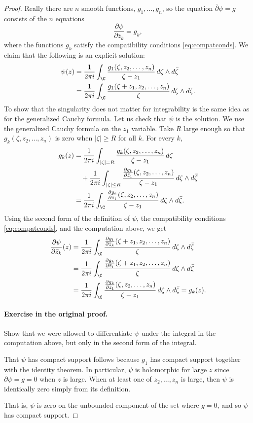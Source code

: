 \begin{proof}
Really there are $n$ smooth functions, $g_1,\ldots,g_n$, so the equation $\bar\partial\psi=g$ consists of the $n$ equations
\[\frac{\partial\psi}{\partial\bar z_k}=g_k,\]
where the functions $g_k$ satisfy the compatibility conditions \eqref{eq:compatconds}. We claim that the following is an explicit solution:
\begin{align*}
\psi(z)&=\frac1{2\pi i}\int_\C\frac{g_1(\zeta,z_2,\ldots,z_n)}{\zeta-z_1}\,d\zeta\wedge d\bar\zeta\\
&=\frac1{2\pi i}\int_\C\frac{g_1(\zeta+z_1,z_2,\ldots,z_n)}{\zeta}\,d\zeta\wedge d\bar\zeta.
\end{align*}
To show that the singularity does not matter for integrability is the same idea as for the generalized Cauchy formula. Let us check that $\psi$ is the solution. We use the generalized Cauchy formula on the $z_1$ variable. Take $R$ large enough so that $g_k(\zeta,z_2,\ldots,z_n)$ is zero when $|\zeta|\geq R$ for all $k$. For every $k$,
\begin{align*}
g_k(z)&=\frac1{2\pi i}\int_{|\zeta|=R}\frac{g_k(\zeta,z_2,\ldots,z_n)}{\zeta-z_1}\,d\zeta\\
&\quad+\frac1{2\pi i}\int_{|\zeta|\leq R}\frac{\frac{\partial g_k}{\partial\bar z_1}(\zeta,z_2,\ldots,z_n)}{\zeta-z_1}\,d\zeta\wedge d\bar\zeta\\
&=\frac1{2\pi i}\int_\C\frac{\frac{\partial g_k}{\partial\bar z_1}(\zeta,z_2,\ldots,z_n)}{\zeta-z_1}\,d\zeta\wedge d\bar\zeta.
\end{align*}
Using the second form of the definition of $\psi$, the compatibility conditions \eqref{eq:compatconds}, and the computation above, we get
\begin{align*}
\frac{\partial\psi}{\partial\bar z_k}(z)
&=\frac1{2\pi i}\int_\C\frac{\frac{\partial g_1}{\partial\bar z_k}(\zeta+z_1,z_2,\ldots,z_n)}{\zeta}\,d\zeta\wedge d\bar\zeta\\
&=\frac1{2\pi i}\int_\C\frac{\frac{\partial g_k}{\partial\bar z_1}(\zeta+z_1,z_2,\ldots,z_n)}{\zeta}\,d\zeta\wedge d\bar\zeta\\
&=\frac1{2\pi i}\int_\C\frac{\frac{\partial g_k}{\partial\bar z_1}(\zeta,z_2,\ldots,z_n)}{\zeta-z_1}\,d\zeta\wedge d\bar\zeta=g_k(z).
\end{align*}
\paragraph{Exercise in the original proof.} Show that we were allowed to differentiate $\psi$ under the integral in the computation above, but only in the second form of the integral.

That $\psi$ has compact support follows because $g_1$ has compact support together with the identity theorem. In particular, $\psi$ is holomorphic for large $z$ since $\bar\partial\psi=g=0$ when $z$ is large. When at least one of $z_2,\ldots,z_n$ is large, then $\psi$ is identically zero simply from its definition.

That is, $\psi$ is zero on the unbounded component of the set where $g=0$, and so $\psi$ has compact support.
\end{proof}

